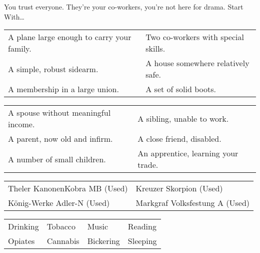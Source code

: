 \documentclass[twoside,headings,a4paper]{article}
\begin{document}
{    You trust everyone. They’re your co-workers, you’re not here for drama.
    \PlaybookRuleR
    {\LARGE\Kochfont Start With\dots}


    \begin{NiceTabular}{XX}
        \circ{} A plane large enough to carry your family. &
        \circ{} Two co-workers with special skills.          \\
        \circ{} A simple, robust sidearm.                  &
        \circ{} A house somewhere relatively safe.           \\
        \circ{} A membership in a large union.             &
        \circ{} A set of solid boots.
    \end{NiceTabular}


    \begin{NiceTabular}{XX}
        \circ{} A spouse without meaningful income. &
        \circ{} A sibling, unable to work.            \\
        \circ{} A parent, now old and infirm.       &
        \circ{} A close friend, disabled.             \\
        \circ{} A number of small children.         &
        \circ{} An apprentice, learning your trade.
    \end{NiceTabular}


    \begin{NiceTabular}{ll}
        \circ{} Theler KanonenKobra MB (Used) &
        \circ{} Kreuzer Skorpion (Used)         \\
        \circ{} König-Werke Adler-N (Used)    &
        \circ{} Markgraf Volksfestung A (Used)
    \end{NiceTabular}


    \begin{NiceTabular}{lXXX}
        \circ{} Drinking  &
        \circ{} Tobacco   &
        \circ{} Music     &
        \circ{} Reading     \\
        \circ{} Opiates   &
        \circ{} Cannabis  &
        \circ{} Bickering &
        \circ{} Sleeping
    \end{NiceTabular}

    \PlaybookRuleR

}
\end{document}
